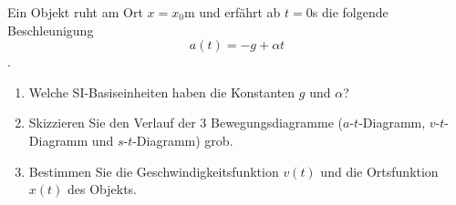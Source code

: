 \begin{ExerciseBlock}
Ein Objekt ruht am Ort $x=x_0$m und erfährt ab $t=0$s die folgende Beschleunigung \[ a(t) = -g + \alpha t \].

\begin{enumerate}
	\item Welche SI-Basiseinheiten haben die Konstanten $g$ und $\alpha$?

	\item Skizzieren Sie den Verlauf der 3 Bewegungsdiagramme ($a$-$t$-Diagramm, $v$-$t$-Diagramm und $s$-$t$-Diagramm) grob.

	\item Bestimmen Sie die Geschwindigkeitsfunktion $v(t)$ und die Ortsfunktion $x(t)$ des Objekts.

\end{enumerate}
\end{ExerciseBlock}

